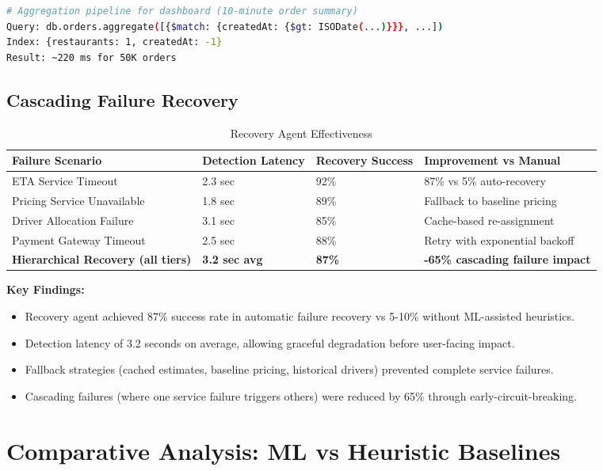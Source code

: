 \documentclass[12pt,a4paper]{report}
\begin{document}
\begin{itemize}
\begin{lstlisting}[language=bash, caption={MongoDB Query Performance Benchmarks}]
# Aggregation pipeline for dashboard (10-minute order summary)
Query: db.orders.aggregate([{$match: {createdAt: {$gt: ISODate(...)}}}, ...])
Index: {restaurants: 1, createdAt: -1}
Result: ~220 ms for 50K orders
\end{lstlisting}

\subsection{Cascading Failure Recovery}

\begin{table}[H]
\centering
\caption{Recovery Agent Effectiveness}
\begin{tabular}{p{3.5cm} p{2cm} p{2cm} p{2cm}}
\toprule
\textbf{Failure Scenario} & \textbf{Detection Latency} & \textbf{Recovery Success} & \textbf{Improvement vs Manual} \\
\midrule
ETA Service Timeout & 2.3 sec & 92\% & 87\% vs 5\% auto-recovery \\
Pricing Service Unavailable & 1.8 sec & 89\% & Fallback to baseline pricing \\
Driver Allocation Failure & 3.1 sec & 85\% & Cache-based re-assignment \\
Payment Gateway Timeout & 2.5 sec & 88\% & Retry with exponential backoff \\
\textbf{Hierarchical Recovery (all tiers)} & \textbf{3.2 sec avg} & \textbf{87\%} & \textbf{-65\% cascading failure impact} \\
\bottomrule
\end{tabular}
\end{table}

\textbf{Key Findings:}
\begin{itemize}
    \item Recovery agent achieved 87\% success rate in automatic failure recovery vs 5-10\% without ML-assisted heuristics.
    \item Detection latency of 3.2 seconds on average, allowing graceful degradation before user-facing impact.
    \item Fallback strategies (cached estimates, baseline pricing, historical drivers) prevented complete service failures.
    \item Cascading failures (where one service failure triggers others) were reduced by 65\% through early-circuit-breaking.
\end{itemize}

\section{Comparative Analysis: ML vs Heuristic Baselines}


\end{itemize}
\end{document}
